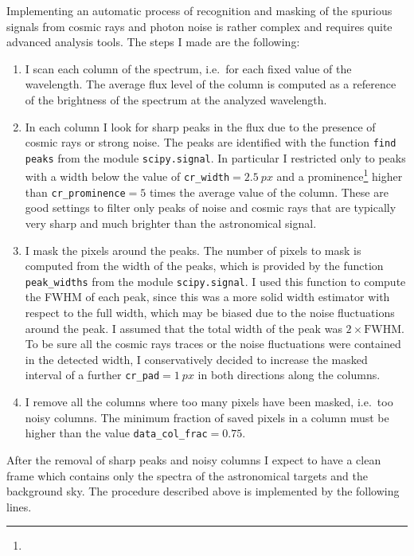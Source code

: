 Implementing an automatic process of recognition and masking of the spurious signals from cosmic rays and photon noise is rather complex and requires quite advanced analysis tools. The steps I made are the following:
\begin{enumerate}
	\item I scan each column of the spectrum, i.e.\ for each fixed value of the wavelength. The average flux level of the column is computed as a reference of the brightness of the spectrum at the analyzed wavelength.
	\item In each column I look for sharp peaks in the flux due to the presence of cosmic rays or strong noise. The peaks are identified with the function \texttt{find peaks} from the module \texttt{scipy.signal}. In particular I restricted only to peaks with a width below the value of \texttt{cr\_width}$=\SI{2.5}{px}$ and a prominence\footnote{} higher than \texttt{cr\_prominence}$=5$ times the average value of the column. These are good settings to filter only peaks of noise and cosmic rays that are typically very sharp and much brighter than the astronomical signal.
	\item I mask the pixels around the peaks. The number of pixels to mask is computed from the width of the peaks, which is provided by the function \texttt{peak\_widths} from the module \texttt{scipy.signal}. I used this function to compute the FWHM of each peak, since this was a more solid width estimator with respect to the full width, which may be biased due to the noise fluctuations around the peak. I assumed that the total width of the peak was $2\times\text{FWHM}$. To be sure all the cosmic rays traces or the noise fluctuations were contained in the detected width, I conservatively decided to increase the masked interval of a further \texttt{cr\_pad}$=\SI{1}{px}$ in both directions along the columns.
	\item I remove all the columns where too many pixels have been masked, i.e.\ too noisy columns. The minimum fraction of saved pixels in a column must be higher than the value \texttt{data\_col\_frac}$=0.75$.	
\end{enumerate}
After the removal of sharp peaks and noisy columns I expect to have a clean frame which contains only the spectra of the astronomical targets and the background sky. The procedure described above is implemented by the following lines.
